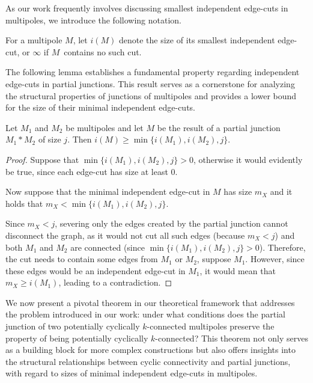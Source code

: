 \documentclass[12pt, twoside]{book}
\begin{document}
As our work frequently involves discussing smallest independent edge-cuts in multipoles, we introduce the following notation.

\begin{definition}
	For a multipole $M$, let $i(M)$ denote the size of its smallest independent edge-cut, or $\infty$ if $M$~contains no such cut.
\end{definition}

The following lemma establishes a fundamental property regarding independent edge-cuts in partial junctions. This result serves as a cornerstone for analyzing the structural properties of junctions of multipoles and provides a lower bound for the size of their minimal independent edge-cuts.

\begin{lemma}\label{lem:size-of-minimal-independent-after-junction}
	Let $M_1$ and $M_2$ be multipoles and let $M$ be the result of a partial junction $M_1*M_2$ of size $j$. Then $i(M)\geq \min\{i(M_1),i(M_2),j\}$.
\end{lemma}

\begin{proof}
	Suppose that $\min\{i(M_1),i(M_2),j\}>0$, otherwise it would evidently be true, since each edge-cut has size at least 0.
	
	Now suppose that the minimal independent edge-cut in $M$ has size $m_X$ and it holds that ${m_X<\min\{i(M_1),i(M_2),j\}}$.
	
	Since $m_X<j$, severing only the edges created by the partial junction cannot disconnect the graph, as it would not cut all such edges (because $m_X<j$) and both $M_1$ and $M_2$ are connected (since ${\min\{i(M_1),i(M_2),j\}>0}$). Therefore, the cut needs to contain some edges from $M_1$ or $M_2$, suppose $M_1$. However, since these edges would be an independent edge-cut in $M_1$, it would mean that $m_X\geq i(M_1)$, leading to a contradiction.
\end{proof}

We now present a pivotal theorem in our theoretical framework that addresses the problem introduced in our work: under what conditions does the partial junction of two potentially cyclically $k$-connected multipoles preserve the property of being potentially cyclically $k$-connected? This theorem not only serves as a building block for more complex constructions but also offers insights into the structural relationships between cyclic connectivity and partial junctions, with regard to sizes of minimal independent edge-cuts in multipoles.
\end{document}
